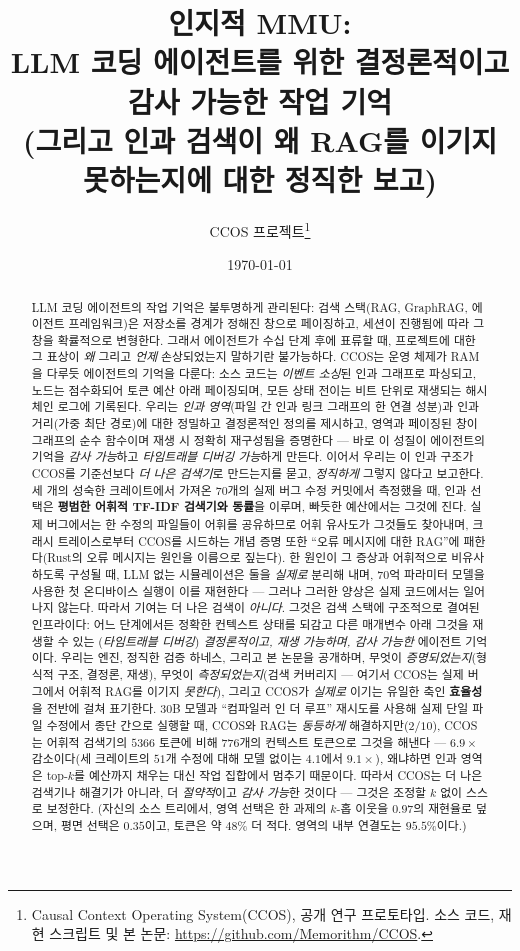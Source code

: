 \documentclass[11pt]{article}
\title{\textbf{인지적 MMU:\\ LLM 코딩 에이전트를 위한 결정론적이고 감사 가능한 작업 기억\\ \large (그리고 인과 검색이 왜 RAG를 이기지 못하는지에 대한 정직한 보고)}}
\author{CCOS 프로젝트\thanks{Causal Context Operating System(CCOS), 공개 연구
프로토타입. 소스 코드, 재현 스크립트 및 본 논문:
\url{https://github.com/Memorithm/CCOS}.}}
\date{\today}
\begin{document}
\maketitle

\begin{abstract}
LLM 코딩 에이전트의 작업 기억은 불투명하게 관리된다: 검색 스택(RAG, GraphRAG, 에이전트
프레임워크)은 저장소를 경계가 정해진 창으로 페이징하고, 세션이 진행됨에 따라 그 창을 확률적으로
변형한다. 그래서 에이전트가 수십 단계 후에 표류할 때, 프로젝트에 대한 그 표상이 \emph{왜} 그리고
\emph{언제} 손상되었는지 말하기란 불가능하다. CCOS는 운영 체제가 RAM을 다루듯 에이전트의 기억을
다룬다: 소스 코드는 \emph{이벤트 소싱}된 인과 그래프로 파싱되고, 노드는 점수화되어 토큰 예산 아래
페이징되며, 모든 상태 전이는 비트 단위로 재생되는 해시 체인 로그에 기록된다. 우리는 \emph{인과
영역}(파일 간 인과 링크 그래프의 한 연결 성분)과 인과 거리(가중 최단 경로)에 대한 정밀하고 결정론적인
정의를 제시하고, 영역과 페이징된 창이 그래프의 순수 함수이며 재생 시 정확히 재구성됨을 증명한다 ---
바로 이 성질이 에이전트의 기억을 \emph{감사 가능}하고 \emph{타임트래블 디버깅 가능}하게 만든다.
이어서 우리는 이 인과 구조가 CCOS를 기준선보다 \emph{더 나은 검색기}로 만드는지를 묻고, \emph{정직하게}
그렇지 않다고 보고한다. 세 개의 성숙한 크레이트에서 가져온 $70$개의 실제 버그 수정 커밋에서 측정했을 때,
인과 선택은 \textbf{평범한 어휘적 TF-IDF 검색기와 동률}을 이루며, 빠듯한 예산에서는 그것에 진다.
실제 버그에서는 한 수정의 파일들이 어휘를 공유하므로 어휘 유사도가 그것들도 찾아내며, 크래시 트레이스로부터
CCOS를 시드하는 개념 증명 또한 ``오류 메시지에 대한 RAG''에 패한다(Rust의 오류 메시지는 원인을 이름으로
짚는다). 한 원인이 그 증상과 어휘적으로 비유사하도록 구성될 때, LLM 없는 시뮬레이션은 둘을 \emph{실제로}
분리해 내며, $70$억 파라미터 모델을 사용한 첫 온디바이스 실행이 이를 재현한다 --- 그러나 그러한 양상은
실제 코드에서는 일어나지 않는다. 따라서 기여는 더 나은 검색이 \emph{아니다}. 그것은 검색 스택에 구조적으로
결여된 인프라이다: 어느 단계에서든 정확한 컨텍스트 상태를 되감고 다른 매개변수 아래 그것을 재생할 수 있는
(\emph{타임트래블 디버깅}) \emph{결정론적이고, 재생 가능하며, 감사 가능한} 에이전트 기억이다. 우리는 엔진,
정직한 검증 하네스, 그리고 본 논문을 공개하며, 무엇이 \emph{증명되었는지}(형식적 구조, 결정론, 재생),
무엇이 \emph{측정되었는지}(검색 커버리지 --- 여기서 CCOS는 실제 버그에서 어휘적 RAG를 이기지 \emph{못한다}),
그리고 CCOS가 \emph{실제로} 이기는 유일한 축인 \textbf{효율성}을 전반에 걸쳐 표기한다. 30B 모델과
``컴파일러 인 더 루프'' 재시도를 사용해 실제 단일 파일 수정에서 종단 간으로 실행할 때, CCOS와 RAG는
\emph{동등하게} 해결하지만($2/10$), CCOS는 어휘적 검색기의 $5366$ 토큰에 비해 $776$개의 컨텍스트 토큰으로
그것을 해낸다 --- $6.9\times$ 감소이다(세 크레이트의 $51$개 수정에 대해 모델 없이는 $4.1$에서 $9.1\times$),
왜냐하면 인과 영역은 top-$k$를 예산까지 채우는 대신 작업 집합에서 멈추기 때문이다. 따라서 CCOS는 더 나은
검색기나 해결기가 아니라, 더 \emph{절약적}이고 \emph{감사 가능}한 것이다 --- 그것은 조정할 $k$ 없이 스스로
보정한다. (자신의 소스 트리에서, 영역 선택은 한 과제의 $k$-홉 이웃을 $0.97$의 재현율로 덮으며, 평면 선택은
$0.35$이고, 토큰은 약 $48\%$ 더 적다. 영역의 내부 연결도는 $95.5\%$이다.)
\end{abstract}
\end{document}
